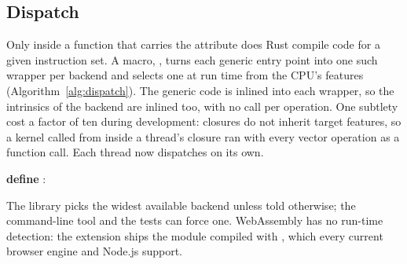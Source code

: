 \subsection{Dispatch}

Only inside a function that carries the attribute  does Rust
compile code for a given instruction set. A macro, , turns each generic entry point into one
such wrapper per backend and selects one at run time from the CPU's features
(Algorithm~\ref{alg:dispatch}). The generic code is inlined into each wrapper, so the
intrinsics of the backend are inlined too, with no call per operation. One subtlety cost a
factor of ten during development: closures do not inherit target features, so a kernel called
from inside a thread's closure ran with every vector operation as a function call. Each thread
now dispatches on its own.

\begin{algorithm}[ht]
  \caption{Dispatch of a generic kernel (simplified from ).}
  \label{alg:dispatch}
  \begin{algorithmic}[1]
        \State \code{\#[target\_feature(enable = "avx2,fma")]}
        \State \textbf{define} : \Return {}
        \State \Return {}
       
       
      \Else\ \Return {}
      \EndIf
    \EndFunction
  \end{algorithmic}
\end{algorithm}

The library picks the widest available backend unless told otherwise; the command-line tool
and the tests can force one. WebAssembly has no run-time detection: the extension ships the
module compiled with , which every current browser engine and Node.js support.
